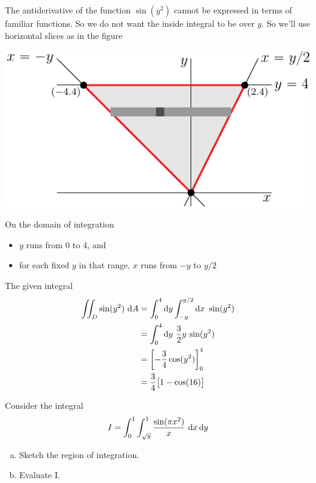 \begin{solution}
The antiderivative of the function $\sin(y^2)$ cannot be expressed
in terms of familiar functions. So we do not want the inside integral to 
be over $y$. So we'll use horizontal slices as in the figure

\begin{center}
     \includegraphics{fig/OE08A_2.pdf}
\end{center}
  
On the domain of integration
\begin{itemize}
\item
   $y$ runs from $0$ to $4$, and
\item
   for each fixed $y$ in that range, $x$ runs from $-y$ to $y/2$
\end{itemize}
The given integral
\begin{align*}
\iint_D \sin(y^2)\ \mathrm{d}A
&=\int_0^4\mathrm{d}y\int_{-y}^{y/2}\mathrm{d}x\ \sin(y^2) \\
&=\int_0^4 \mathrm{d}y\ \frac{3}{2}y\,\sin(y^2) \\
&=\left[-\frac{3}{4}\cos(y^2)\right]_0^4 \\
&=\frac{3}{4}\big[1-\cos(16)\big]
\end{align*}

\end{solution}

\begin{question}[M200 2008D] %
Consider the integral
\begin{equation*}
I = \int_0^1 \int_{\sqrt{y}}^1 \frac{\sin(\pi x^2)}{x}\ \mathrm{d}x\,\mathrm{d}y
\end{equation*}

\begin{enumerate}[(a)]
\item
Sketch the region of integration.
\item 
Evaluate I.

\end{enumerate}
\end{question}

